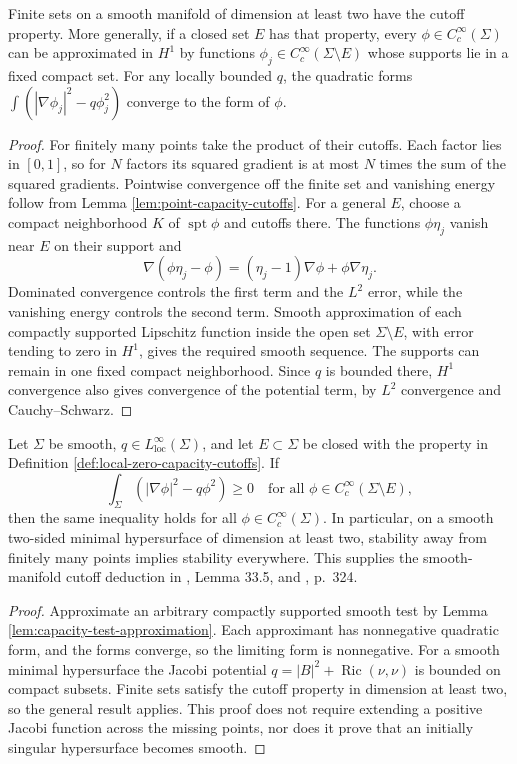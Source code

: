 \begin{lemma}\label{lem:capacity-test-approximation}
Finite sets on a smooth manifold of dimension at least two have the cutoff property. More generally, if a closed set $E$ has that property, every $\phi\in C_c^\infty(\Sigma)$ can be approximated in $H^1$ by functions $\phi_j\in C_c^\infty(\Sigma\setminus E)$ whose supports lie in a fixed compact set. For any locally bounded $q$, the quadratic forms $\int(|\nabla\phi_j|^2-q\phi_j^2)$ converge to the form of $\phi$.
\end{lemma}
\begin{proof}
For finitely many points take the product of their cutoffs. Each factor lies in $[0,1]$, so for $N$ factors its squared gradient is at most $N$ times the sum of the squared gradients. Pointwise convergence off the finite set and vanishing energy follow from Lemma \ref{lem:point-capacity-cutoffs}.
For a general $E$, choose a compact neighborhood $K$ of $\operatorname{spt}\phi$ and cutoffs there. The functions $\phi\eta_j$ vanish near $E$ on their support and
\[
 \nabla(\phi\eta_j-\phi)=(\eta_j-1)\nabla\phi+\phi\nabla\eta_j.
\]
Dominated convergence controls the first term and the $L^2$ error, while the vanishing energy controls the second term. Smooth approximation of each compactly supported Lipschitz function inside the open set $\Sigma\setminus E$, with error tending to zero in $H^1$, gives the required smooth sequence. The supports can remain in one fixed compact neighborhood. Since $q$ is bounded there, $H^1$ convergence also gives convergence of the potential term, by $L^2$ convergence and Cauchy--Schwarz.
\end{proof}

\begin{theorem}\label{thm:removable-stability-capacity}
Let $\Sigma$ be smooth, $q\in L^\infty_{\mathrm{loc}}(\Sigma)$, and let $E\subset\Sigma$ be closed with the property in Definition \ref{def:local-zero-capacity-cutoffs}. If
\[
 \int_\Sigma(|\nabla\phi|^2-q\phi^2)\geq0
 \quad\text{for all }\phi\in C_c^\infty(\Sigma\setminus E),
\]
then the same inequality holds for all $\phi\in C_c^\infty(\Sigma)$. In particular, on a smooth two-sided minimal hypersurface of dimension at least two, stability away from finitely many points implies stability everywhere. This supplies the smooth-manifold cutoff deduction in \cite{ChMin}, Lemma 33.5, and \cite{Sharp17}, p.~324.
\end{theorem}
\begin{proof}
Approximate an arbitrary compactly supported smooth test by Lemma \ref{lem:capacity-test-approximation}. Each approximant has nonnegative quadratic form, and the forms converge, so the limiting form is nonnegative. For a smooth minimal hypersurface the Jacobi potential $q=|B|^2+\operatorname{Ric}(\nu,\nu)$ is bounded on compact subsets. Finite sets satisfy the cutoff property in dimension at least two, so the general result applies. This proof does not require extending a positive Jacobi function across the missing points, nor does it prove that an initially singular hypersurface becomes smooth.
\end{proof}

